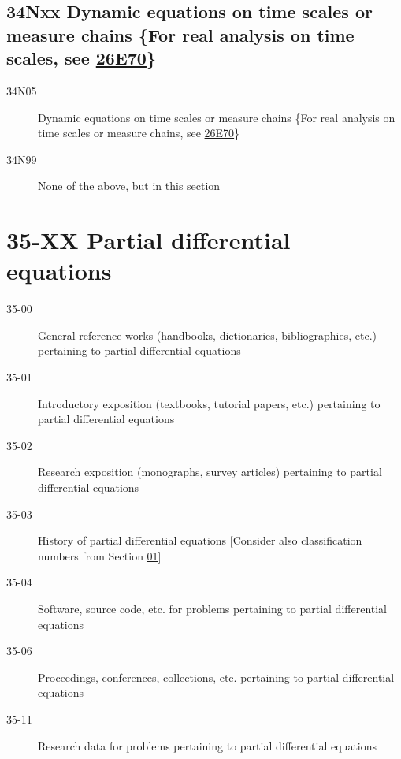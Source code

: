 \documentclass[letterpaper]{article}
\begin{document}
\subsection*{34Nxx  Dynamic equations on time scales or measure chains \{For real analysis on time scales, see \hyperref[26E70]{26E70}\} }\label{34Nxx}
\begin{description}  
\item [34N05]\label{34N05} Dynamic equations on time scales or measure chains \{For real analysis on time scales or measure chains, see \hyperref[26E70]{26E70}\}
\item [34N99]\label{34N99} None of the above, but in this section
\end{description}
\section*{35-XX Partial differential equations}\label{35-XX}
\begin{description}
\item [35-00]\label{35-00} General reference works (handbooks, dictionaries, bibliographies, etc.) pertaining to partial differential equations
\item [35-01]\label{35-01} Introductory exposition (textbooks, tutorial papers, etc.) pertaining to partial differential equations
\item [35-02]\label{35-02} Research exposition (monographs, survey articles) pertaining to partial differential equations
\item [35-03]\label{35-03} History of partial differential equations [Consider also classification numbers from Section \hyperref[01-XX]{01}]
\item [35-04]\label{35-04} Software, source code, etc. for problems pertaining to partial differential equations
\item [35-06]\label{35-06} Proceedings, conferences, collections, etc. pertaining to partial differential equations
\item [35-11]\label{35-11} Research data for problems pertaining to partial differential equations
\end{description}
\end{document}
